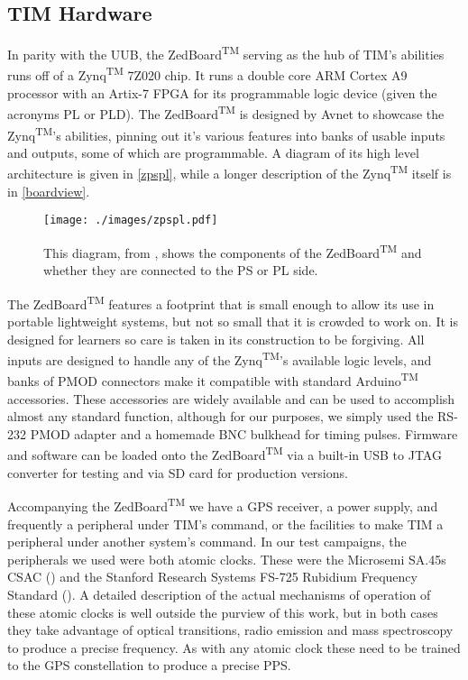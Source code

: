 \subsection{TIM Hardware}
In parity with the UUB, the ZedBoard\textsuperscript{TM} serving as the hub of TIM's abilities runs off of a Zynq\textsuperscript{TM} 7Z020 chip. It runs a double core ARM Cortex A9 processor with an Artix-7 FPGA for its programmable logic device (given the acronyms PL or PLD). The ZedBoard\textsuperscript{TM} is designed by Avnet to showcase the Zynq\textsuperscript{TM}'s abilities, pinning out it's various features into banks of usable inputs and outputs, some of which are programmable. A diagram of its high level architecture is given in \autoref{zpspl}, while a longer description of the Zynq\textsuperscript{TM} itself is in \autoref{boardview}.

\begin{figure}[h!]
\centering
\texttt{[image: ./images/zpspl.pdf]}
\caption[Zynq PS/PL Programmability Diagram]{This diagram, from \textcite{zbspec}, shows the components of the ZedBoard\textsuperscript{TM} and whether they are connected to the PS or PL side.}
\label{zpspl}
\end{figure}

The ZedBoard\textsuperscript{TM} features a footprint that is small enough to allow its use in portable lightweight systems, but not so small that it is crowded to work on. It is designed for learners so care is taken in its construction to be forgiving. All inputs are designed to handle any of the Zynq\textsuperscript{TM}'s available logic levels, and banks of PMOD connectors make it compatible with standard Arduino\textsuperscript{TM} accessories. These accessories are widely available and can be used to accomplish almost any standard function, although for our purposes, we simply used the RS-232 PMOD adapter and a homemade BNC bulkhead for timing pulses. Firmware and software can be loaded onto the ZedBoard\textsuperscript{TM} via a built-in USB to JTAG converter for testing and via SD card for production versions.

Accompanying the ZedBoard\textsuperscript{TM} we have a GPS receiver, a power supply, and frequently a peripheral under TIM's command, or the facilities to make TIM a peripheral under another system's command. In our test campaigns, the peripherals we used were both atomic clocks. These were the Microsemi SA.45s CSAC (\cite{csac}) and the Stanford Research Systems FS-725 Rubidium Frequency Standard (\cite{fs725spec}). A detailed description of the actual mechanisms of operation of these atomic clocks is well outside the purview of this work, but in both cases they take advantage of optical transitions, radio emission and mass spectroscopy to produce a precise frequency. As with any atomic clock these need to be trained to the GPS constellation to produce a precise PPS.


